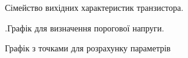 \documentclass[a4paper,14pt]{extreport}
\begin{document}
\begin{figure}[h]
\caption{Сімейство вихідних характеристик транзистора.}
\label{ris3}
\end{figure}

\begin{figure}[h]
\caption{.Графік для визначення порогової напруги.}
\label{ris5}
\end{figure}

\begin{figure}[h]
\caption{Графік з точками для розрахунку параметрів}
\label{ris6}
\end{figure}
\end{document}
